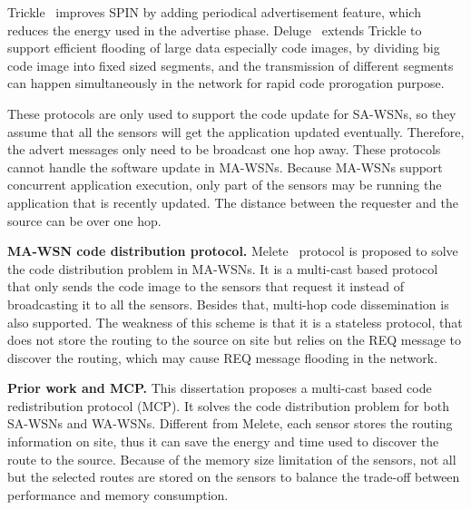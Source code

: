 Trickle~\cite{trickle} improves SPIN by adding periodical advertisement feature, which reduces the energy used in the advertise phase. Deluge~\cite{deluge} extends Trickle to support efficient flooding of large data especially code images, by dividing big code image into fixed sized segments, and the transmission of different segments can happen simultaneously in the network for rapid code prorogation purpose. 

These protocols are only used to support the code update for SA-WSNs, so they assume that all the sensors will get the application updated eventually. Therefore, the advert messages only need to be broadcast one hop away.
These protocols cannot handle the software update in MA-WSNs.
Because MA-WSNs support concurrent application execution, only part of the sensors may be running the application that is recently updated. 
The distance between the requester and the source can be over one hop.

\textbf{MA-WSN code distribution protocol.}
 Melete~\cite{melete} protocol is proposed to solve the code distribution problem in MA-WSNs.
It is a multi-cast based protocol that only sends the code image to the sensors that request it instead of broadcasting it to all the sensors. Besides that, multi-hop code dissemination is also supported. The weakness of this scheme is that it is a stateless protocol, that does not store the routing to the source on site but relies on the REQ message to discover the routing, which may cause REQ message flooding in the network.


\textbf{Prior work and MCP.}
This dissertation proposes a multi-cast based code redistribution protocol (MCP).
It solves the code distribution problem for both SA-WSNs and WA-WSNs.
Different from Melete, each sensor stores the routing information on site, thus
it can save the energy and time used to discover the route to the source.
Because of the memory size limitation of the sensors, not all but the selected routes
are stored on the sensors to balance the trade-off between performance and memory consumption.

